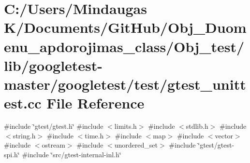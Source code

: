 \hypertarget{_obj__test_2lib_2googletest-master_2googletest_2test_2gtest__unittest_8cc}{}\section{C\+:/\+Users/\+Mindaugas K/\+Documents/\+Git\+Hub/\+Obj\+\_\+\+Duomenu\+\_\+apdorojimas\+\_\+class/\+Obj\+\_\+test/lib/googletest-\/master/googletest/test/gtest\+\_\+unittest.cc File Reference}
\label{_obj__test_2lib_2googletest-master_2googletest_2test_2gtest__unittest_8cc}
{\ttfamily \#include \char`\"{}gtest/gtest.\+h\char`\"{}}\newline
{\ttfamily \#include $<$limits.\+h$>$}\newline
{\ttfamily \#include $<$stdlib.\+h$>$}\newline
{\ttfamily \#include $<$string.\+h$>$}\newline
{\ttfamily \#include $<$time.\+h$>$}\newline
{\ttfamily \#include $<$map$>$}\newline
{\ttfamily \#include $<$vector$>$}\newline
{\ttfamily \#include $<$ostream$>$}\newline
{\ttfamily \#include $<$unordered\+\_\+set$>$}\newline
{\ttfamily \#include \char`\"{}gtest/gtest-\/spi.\+h\char`\"{}}\newline
{\ttfamily \#include \char`\"{}src/gtest-\/internal-\/inl.\+h\char`\"{}}\newline
